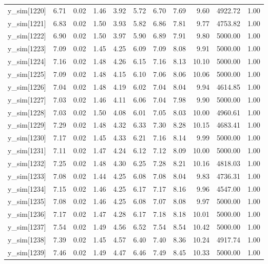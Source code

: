 \begin{table}[ht]
\begin{tabular}{rrrrrrrrrrr}
  y\_sim[1220] & 6.71 & 0.02 & 1.46 & 3.92 & 5.72 & 6.70 & 7.69 & 9.60 & 4922.72 & 1.00 \\ 
  y\_sim[1221] & 6.83 & 0.02 & 1.50 & 3.93 & 5.82 & 6.86 & 7.81 & 9.77 & 4753.82 & 1.00 \\ 
  y\_sim[1222] & 6.90 & 0.02 & 1.50 & 3.97 & 5.90 & 6.89 & 7.91 & 9.80 & 5000.00 & 1.00 \\ 
  y\_sim[1223] & 7.09 & 0.02 & 1.45 & 4.25 & 6.09 & 7.09 & 8.08 & 9.91 & 5000.00 & 1.00 \\ 
  y\_sim[1224] & 7.16 & 0.02 & 1.48 & 4.26 & 6.15 & 7.16 & 8.13 & 10.10 & 5000.00 & 1.00 \\ 
  y\_sim[1225] & 7.09 & 0.02 & 1.48 & 4.15 & 6.10 & 7.06 & 8.06 & 10.06 & 5000.00 & 1.00 \\ 
  y\_sim[1226] & 7.04 & 0.02 & 1.48 & 4.19 & 6.02 & 7.04 & 8.04 & 9.94 & 4614.85 & 1.00 \\ 
  y\_sim[1227] & 7.03 & 0.02 & 1.46 & 4.11 & 6.06 & 7.04 & 7.98 & 9.90 & 5000.00 & 1.00 \\ 
  y\_sim[1228] & 7.03 & 0.02 & 1.50 & 4.08 & 6.01 & 7.05 & 8.03 & 10.00 & 4960.61 & 1.00 \\ 
  y\_sim[1229] & 7.29 & 0.02 & 1.48 & 4.32 & 6.33 & 7.30 & 8.28 & 10.15 & 4683.41 & 1.00 \\ 
  y\_sim[1230] & 7.17 & 0.02 & 1.45 & 4.33 & 6.21 & 7.16 & 8.14 & 9.99 & 5000.00 & 1.00 \\ 
  y\_sim[1231] & 7.11 & 0.02 & 1.47 & 4.24 & 6.12 & 7.12 & 8.09 & 10.00 & 5000.00 & 1.00 \\ 
  y\_sim[1232] & 7.25 & 0.02 & 1.48 & 4.30 & 6.25 & 7.28 & 8.21 & 10.16 & 4818.03 & 1.00 \\ 
  y\_sim[1233] & 7.08 & 0.02 & 1.44 & 4.25 & 6.08 & 7.08 & 8.04 & 9.83 & 4736.31 & 1.00 \\ 
  y\_sim[1234] & 7.15 & 0.02 & 1.46 & 4.25 & 6.17 & 7.17 & 8.16 & 9.96 & 4547.00 & 1.00 \\ 
  y\_sim[1235] & 7.08 & 0.02 & 1.46 & 4.25 & 6.08 & 7.07 & 8.08 & 9.97 & 5000.00 & 1.00 \\ 
  y\_sim[1236] & 7.17 & 0.02 & 1.47 & 4.28 & 6.17 & 7.18 & 8.18 & 10.01 & 5000.00 & 1.00 \\ 
  y\_sim[1237] & 7.54 & 0.02 & 1.49 & 4.56 & 6.52 & 7.54 & 8.54 & 10.42 & 5000.00 & 1.00 \\ 
  y\_sim[1238] & 7.39 & 0.02 & 1.45 & 4.57 & 6.40 & 7.40 & 8.36 & 10.24 & 4917.74 & 1.00 \\ 
  y\_sim[1239] & 7.46 & 0.02 & 1.49 & 4.47 & 6.46 & 7.49 & 8.45 & 10.33 & 5000.00 & 1.00 \\ 

\end{tabular}
\end{table}
